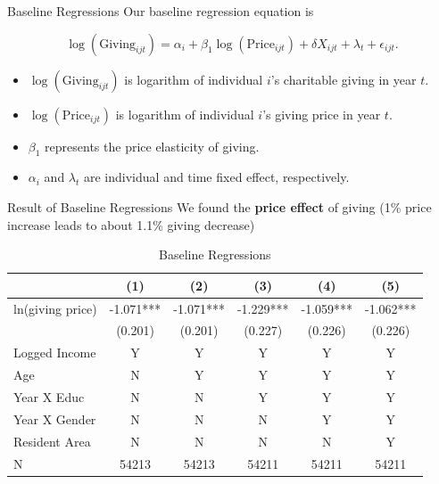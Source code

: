 \documentclass[
  ignorenonframetext,
]{beamer}
\providecommand{\tightlist}{%
  \setlength{\itemsep}{0pt}\setlength{\parskip}{0pt}}
\begin{document}
\begin{frame}{Baseline Regressions}
\protect\hypertarget{baseline-regressions}{}
Our baseline regression equation is

\[
    \log(\text{Giving}_{ijt}) = 
    \alpha_i + \beta_1 \log(\text{Price}_{ijt}) + \delta X_{ijt} + \lambda_t + \epsilon_{ijt}.
\]

\begin{itemize}
\tightlist
\item
  \(\log(\text{Giving}_{ijt})\) is logarithm of individual \(i\)'s charitable giving in year \(t\).
\item
  \(\log(\text{Price}_{ijt})\) is logarithm of individual \(i\)'s giving price in year \(t\).
\item
  \(\beta_1\) represents the price elasticity of giving.
\item
  \(\alpha_i\) and \(\lambda_t\) are individual and time fixed effect, respectively.
\end{itemize}
\end{frame}

\begin{frame}{Result of Baseline Regressions}
\protect\hypertarget{result-of-baseline-regressions}{}
We found the \textbf{price effect} of giving (1\% price increase leads to about 1.1\% giving decrease)

\begin{table}

\caption{\label{tab:kableEstimateElasticity}Baseline Regressions}
\centering
\fontsize{9}{11}\selectfont
\begin{tabular}[t]{lccccc}
\toprule
 & (1) & (2) & (3) & (4) & (5)\\
\midrule
ln(giving price) & -1.071*** & -1.071*** & -1.229*** & -1.059*** & -1.062***\\
 & (0.201) & (0.201) & (0.227) & (0.226) & (0.226)\\
Logged Income & Y & Y & Y & Y & Y\\
Age & N & Y & Y & Y & Y\\
Year X Educ & N & N & Y & Y & Y\\
Year X Gender & N & N & N & Y & Y\\
Resident Area & N & N & N & N & Y\\
N & 54213 & 54213 & 54211 & 54211 & 54211\\
\bottomrule
\end{tabular}
\end{table}
\end{frame}
\end{document}
